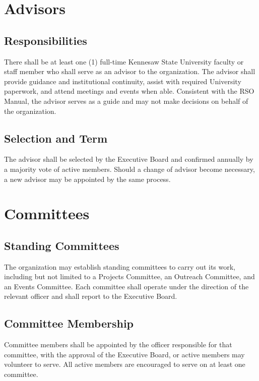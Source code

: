\documentclass[12pt,letterpaper]{article} %
\begin{document}
\section{Advisors}\label{art:advisors} %
\subsection{Responsibilities}\label{sec:advisor-responsibilities}
There shall be at least one (1) full-time Kennesaw State University faculty or staff member
who shall serve as an advisor to the organization. The advisor shall provide guidance and
institutional continuity, assist with required University paperwork, and attend meetings
and events when able. Consistent with the RSO Manual, the advisor serves as a guide and
may not make decisions on behalf of the organization.
\subsection{Selection and Term}\label{sec:advisor-selection}
The advisor shall be selected by the Executive Board and confirmed annually by a majority
vote of active members. Should a change of advisor become necessary, a new advisor may be
appointed by the same process.

\section{Committees}\label{art:committees} %
\subsection{Standing Committees}\label{sec:standing-committees}
The organization may establish standing committees to carry out its work, including but
not limited to a Projects Committee, an Outreach Committee, and an Events Committee.
Each committee shall operate under the direction of the relevant officer and shall report
to the Executive Board.
\subsection{Committee Membership}\label{sec:committee-membership}
Committee members shall be appointed by the officer responsible for that committee,
with the approval of the Executive Board, or active members may volunteer to serve.
All active members are encouraged to serve on at least one committee.
\end{document}
